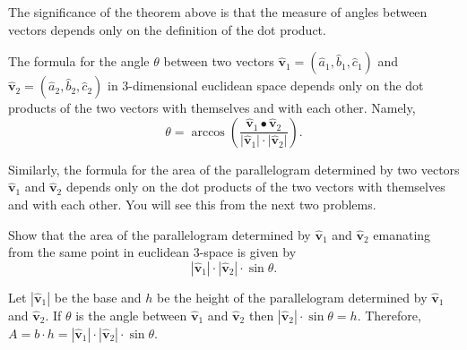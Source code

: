 \documentclass[newpage,hints,handout,nooutcomes,noauthor,12pt]{ximera}
\begin{document}
The significance of the theorem above is that the measure of angles between
vectors depends only on the definition of the dot product.

\begin{corollary}
The formula for the angle $\theta$ between two vectors $\hat{\mathbf v}_{1}=
(\hat{a}_{1},\hat{b}_{1},\hat{c}_{1})$ and $\hat{\mathbf v}_{2}=
(\hat{a}_{2},\hat{b}_{2},\hat{c}_{2})$ in $3$-dimensional euclidean space
depends only on the dot products of the two vectors with themselves and with
each other.  Namely,%
\[
\theta=\arccos\left(\frac{\hat{\mathbf v}_{1}\bullet\hat{\mathbf v}_{2}}
                   {\lvert \hat{\mathbf v}_{1}\rvert \cdot \lvert \hat{\mathbf v}_{2}\rvert}\right).
\]
\end{corollary}

Similarly, the formula for the area of the parallelogram determined by two
vectors $\hat{\mathbf v}_{1}$ and $\hat{\mathbf v}_{2}$ depends only on the dot
products of the two vectors with themselves and with each other. You will see
this from the next two problems.

\begin{problem}
Show that the area of the parallelogram determined by $\hat{\mathbf v}_{1}$ and
$\hat{\mathbf v}_{2}$ emanating from the same point in euclidean $3$-space is
given by%
\[
|\hat{\mathbf v}_{1}|\cdot|\hat{\mathbf v}_{2}|\cdot\sin\theta.
\]


\begin{freeResponse}

Let $|\hat{\mathbf v}_{1}|$ be the base and $h$ be the height of the parallelogram determined by  $\hat{\mathbf v}_{1}$ and $\hat{\mathbf v}_{2}$.  If $\theta$ is the angle between $\hat{\mathbf v}_{1}$ and $\hat{\mathbf v}_{2}$ then $|\hat{\mathbf v}_{2}|\cdot \sin\theta = h$. Therefore, $A = b \cdot h = |\hat{\mathbf v}_{1}| \cdot |\hat{\mathbf v}_{2}| \cdot\sin\theta$.

\end{freeResponse}
\end{problem}
\end{document}
